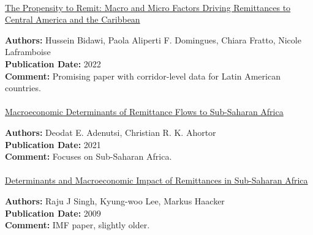 \documentclass[
  11pt,
]{article}
\makeatletter
\let\oldparagraph\paragraph
\renewcommand{\paragraph}{
    \@ifstar
      \xxxParagraphStar
      \xxxParagraphNoStar
  }
\newcommand{\xxxParagraphStar}[1]{\oldparagraph*{#1}\mbox{}}
\newcommand{\xxxParagraphNoStar}[1]{\oldparagraph{#1}\mbox{}}
\makeatother
\begin{document}
\paragraph{\texorpdfstring{\href{https://www.elibrary.imf.org/view/journals/001/2022/203/article-A001-en.xml}{The
Propensity to Remit: Macro and Micro Factors Driving Remittances to
Central America and the
Caribbean}}{The Propensity to Remit: Macro and Micro Factors Driving Remittances to Central America and the Caribbean}}\label{the-propensity-to-remit-macro-and-micro-factors-driving-remittances-to-central-america-and-the-caribbean}

\textbf{Authors:} Hussein Bidawi, Paola Aliperti F. Domingues, Chiara
Fratto, Nicole Laframboise\\
\textbf{Publication Date:} 2022\\
\textbf{Comment:} Promising paper with corridor-level data for Latin
American countries.

\paragraph{\texorpdfstring{\href{https://www.aercafrica.org/publications/research-papers/macroeconomic-determinants-of-remittance-flows-to-sub-saharan-africa/}{Macroeconomic
Determinants of Remittance Flows to Sub-Saharan
Africa}}{Macroeconomic Determinants of Remittance Flows to Sub-Saharan Africa}}\label{macroeconomic-determinants-of-remittance-flows-to-sub-saharan-africa}

\textbf{Authors:} Deodat E. Adenutsi, Christian R. K. Ahortor\\
\textbf{Publication Date:} 2021\\
\textbf{Comment:} Focuses on Sub-Saharan Africa.

\paragraph{\texorpdfstring{\href{https://www.elibrary.imf.org/view/journals/001/2009/216/article-A001-en.xml}{Determinants
and Macroeconomic Impact of Remittances in Sub-Saharan
Africa}}{Determinants and Macroeconomic Impact of Remittances in Sub-Saharan Africa}}\label{determinants-and-macroeconomic-impact-of-remittances-in-sub-saharan-africa}

\textbf{Authors:} Raju J Singh, Kyung-woo Lee, Markus Haacker\\
\textbf{Publication Date:} 2009\\
\textbf{Comment:} IMF paper, slightly older.
\end{document}
